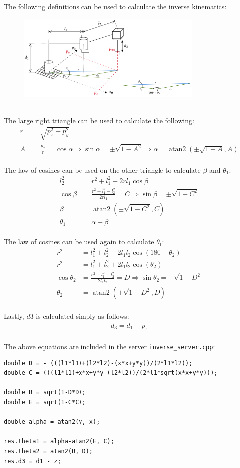 \documentclass[10pt]{article}
\DeclareMathOperator{\atantwo}{atan2}
\begin{document}
\begin{enumerate}
	The following definitions can be used to calculate the inverse kinematics:
	\begin{figure}[h]
		\centering
		\includegraphics[width=0.8\textwidth]{figures/rrp_IK.png}
	\end{figure}
	\\
	The large right triangle can be used to calculate the following:
	\begin{align*}
		r &= \sqrt{p_x^2 + p_y^2} \\
		A &= \frac{p_x}{r} = \cos\alpha \Rightarrow
		\sin \alpha = \pm \sqrt{1 - A^2} \Rightarrow \alpha = \atantwo\left(\pm \sqrt{1-A}, A\right)
	\end{align*}
	\\
	The law of cosines can be used on the other triangle to calculate $\beta$ and $\theta_1$:
	\begin{align*}
		l_2^2 &= r^2 + l_1^2 - 2 r l_1 \cos\beta \\
		\cos\beta & = \frac{r^2 + l_1^2 - l_2^2}{2 r l_1} = C \Rightarrow \sin\beta = \pm\sqrt{1-C^2} \\
		\beta &= \atantwo\left(\pm\sqrt{1-C^2}, C\right) \\
		\theta_1 &= \alpha - \beta
	\end{align*}
	\\
	The law of cosines can be used again to calculate $\theta_1$:
	\begin{align*}
		r^2 &= l_1^2 + l_2^2 - 2 l_1 l_2 \cos(180-\theta_2) \\
		r^2 &= l_1^2 + l_2^2 + 2 l_1 l_2 \cos(\theta_2) \\
		\cos\theta_2 & = \frac{r^2 - l_1^2 - l_2^2}{2 l_1 l_2} = D \Rightarrow \sin\theta_2 = \pm\sqrt{1-D^2} \\
		\theta_2 &= \atantwo\left(\pm\sqrt{1-D^2}, D\right)
	\end{align*}
	\\
	Lastly, $d3$ is calculated simply as follows:
	\begin{align*}
		d_3 = d_1 - p_z
	\end{align*}
	\\
	The above equations are included in the server \texttt{inverse\_server.cpp}:
\begin{lstlisting}[style=Matlab-editor,basicstyle=\mlttfamily,escapechar=`]
double D = - (((l1*l1)+(l2*l2)-(x*x+y*y))/(2*l1*l2));
double C = (((l1*l1)+x*x+y*y-(l2*l2))/(2*l1*sqrt(x*x+y*y)));

double B = sqrt(1-D*D);
double E = sqrt(1-C*C);

double alpha = atan2(y, x);

res.theta1 = alpha-atan2(E, C);
res.theta2 = atan2(B, D);
res.d3 = d1 - z;
\end{lstlisting}
\end{enumerate}
\end{document}
